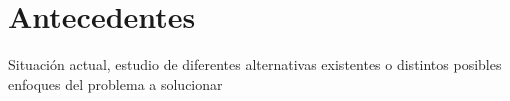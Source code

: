 \chapter{Antecedentes}
Situación actual, estudio de diferentes alternativas 
existentes o distintos posibles enfoques del problema a solucionar